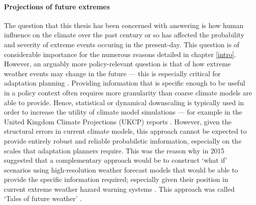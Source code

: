     \paragraph*{Projections of future extremes}

      The question that this thesis has been concerned with answering is how human influence on the climate over the past century or so has affected the probability and severity of extreme events occuring in the present-day. This question is of considerable importance for the numerous reasons detailed in chapter \ref{intro}. However, an arguably more policy-relevant question is that of how extreme weather events may change in the future --- this is especially critical for adaptation planning \citep{harrington_integrating_2022}. Providing information that is specific enough to be useful in a policy context often requires more granularity than coarse climate models are able to provide. Hence, statistical or dynamical downscaling is typically used in order to increase the utility of climate model simulations --- for example in the United Kingdom Climate Projections (UKCP) reports \citep{lowe_uk_2009,murphy_uk_2009,lowe_ukcp18_2018,murphy_ukcp18_2018}. However, given the structural errors in current climate models, this approach cannot be expected to provide entirely robust and reliable probabilstic imformation, especially on the scales that adaptation planners require. This was the reason why in 2015 \citeauthor{hazeleger_tales_2015} suggested that a complementary approach would be to construct `what if' scenarios using high-resolution weather forecast models that would be able to provide the specific information required; especially given their position in current extreme weather hazard warning systems \citep{schaller_role_2020}. This approach was called `Tales of future weather' \citep{hazeleger_tales_2015}.

